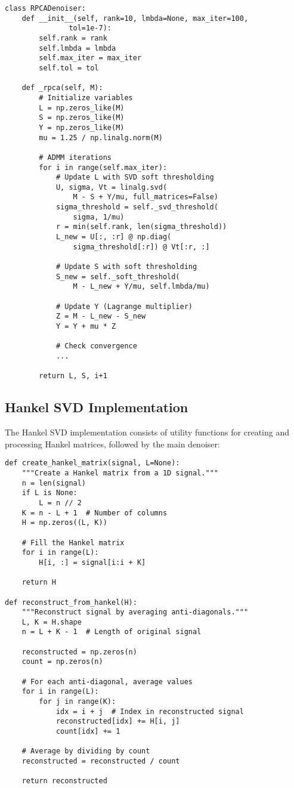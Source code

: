 \documentclass[11pt]{article}
\begin{document}
\begin{lstlisting}
class RPCADenoiser:
    def __init__(self, rank=10, lmbda=None, max_iter=100, 
               tol=1e-7):
        self.rank = rank
        self.lmbda = lmbda
        self.max_iter = max_iter
        self.tol = tol
    
    def _rpca(self, M):
        # Initialize variables
        L = np.zeros_like(M)
        S = np.zeros_like(M)
        Y = np.zeros_like(M)
        mu = 1.25 / np.linalg.norm(M)
        
        # ADMM iterations
        for i in range(self.max_iter):
            # Update L with SVD soft thresholding
            U, sigma, Vt = linalg.svd(
                M - S + Y/mu, full_matrices=False)
            sigma_threshold = self._svd_threshold(
                sigma, 1/mu)
            r = min(self.rank, len(sigma_threshold))
            L_new = U[:, :r] @ np.diag(
                sigma_threshold[:r]) @ Vt[:r, :]
            
            # Update S with soft thresholding
            S_new = self._soft_threshold(
                M - L_new + Y/mu, self.lmbda/mu)
            
            # Update Y (Lagrange multiplier)
            Z = M - L_new - S_new
            Y = Y + mu * Z
            
            # Check convergence
            ...
            
        return L, S, i+1
\end{lstlisting}

\subsection{Hankel SVD Implementation}
The Hankel SVD implementation consists of utility functions for creating and processing Hankel matrices, followed by the main denoiser:

\begin{lstlisting}
def create_hankel_matrix(signal, L=None):
    """Create a Hankel matrix from a 1D signal."""
    n = len(signal)
    if L is None:
        L = n // 2
    K = n - L + 1  # Number of columns
    H = np.zeros((L, K))
    
    # Fill the Hankel matrix
    for i in range(L):
        H[i, :] = signal[i:i + K]
    
    return H

def reconstruct_from_hankel(H):
    """Reconstruct signal by averaging anti-diagonals."""
    L, K = H.shape
    n = L + K - 1  # Length of original signal
    
    reconstructed = np.zeros(n)
    count = np.zeros(n)
    
    # For each anti-diagonal, average values
    for i in range(L):
        for j in range(K):
            idx = i + j  # Index in reconstructed signal
            reconstructed[idx] += H[i, j]
            count[idx] += 1
    
    # Average by dividing by count
    reconstructed = reconstructed / count
    
    return reconstructed
\end{lstlisting}
\end{document}
